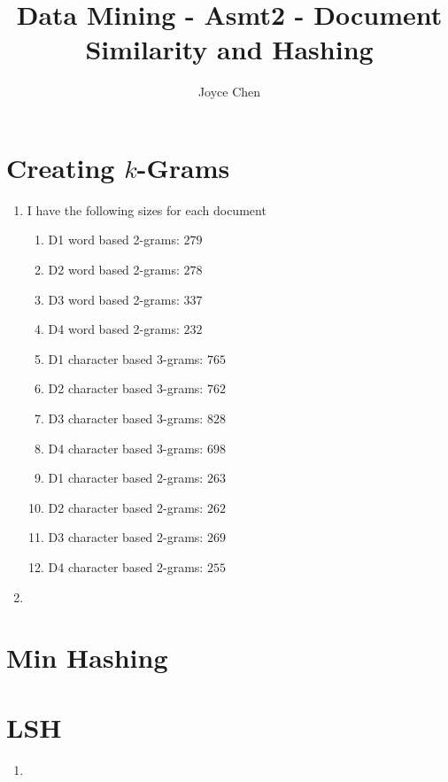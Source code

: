 \documentclass[11pt]{article}
\title{Data Mining - Asmt2 - Document Similarity and Hashing}
\author{Joyce Chen}
\begin{document}
\maketitle

\section{Creating $k$-Grams}
\begin{enumerate}[label=A.\arabic*]
\item
I have the following sizes for each document \\
\begin{enumerate}[label=\arabic*)]
\item
D1 word based 2-grams: $279$
\item
D2 word based 2-grams: $278$
\item
D3 word based 2-grams: $337$
\item
D4 word based 2-grams: $232$
\item
D1 character based 3-grams: $765$
\item
D2 character based 3-grams: $762$
\item
D3 character based 3-grams: $828$
\item
D4 character based 3-grams: $698$
\item
D1 character based 2-grams: $263$
\item
D2 character based 2-grams: $262$
\item
D3 character based 2-grams: $269$
\item
D4 character based 2-grams: $255$
\end{enumerate}

\item


\end{enumerate}

\section{Min Hashing}

\section{LSH}
\begin{enumerate}[label=\Alph*]
\item


\end{enumerate}
\end{document}
